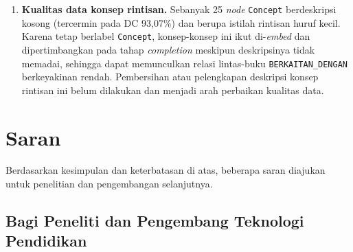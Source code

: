 \documentclass[../../thesis]{subfiles}
\begin{document}
\begin{enumerate}
  \item \textbf{Kualitas data konsep rintisan.} Sebanyak 25 \textit{node}
        \texttt{Concept} berdeskripsi kosong (tercermin pada DC 93{,}07\%) dan
        berupa istilah rintisan huruf kecil. Karena tetap berlabel
        \texttt{Concept}, konsep-konsep ini ikut di-\textit{embed} dan
        dipertimbangkan pada tahap \textit{completion} meskipun deskripsinya
        tidak memadai, sehingga dapat memunculkan relasi lintas-buku
        \texttt{BERKAITAN\_DENGAN} berkeyakinan rendah. Pembersihan atau
        pelengkapan deskripsi konsep rintisan ini belum dilakukan dan menjadi
        arah perbaikan kualitas data.
\end{enumerate}

\section{Saran}

Berdasarkan kesimpulan dan keterbatasan di atas, beberapa saran diajukan untuk
penelitian dan pengembangan selanjutnya.

\subsection{Bagi Peneliti dan Pengembang Teknologi Pendidikan}
\end{document}
